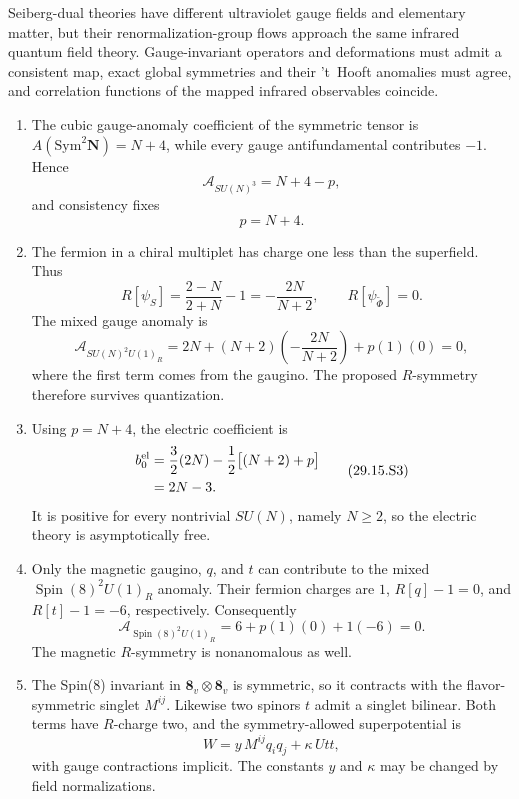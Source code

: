 \begin{enumerate}
  Seiberg-dual theories have different ultraviolet gauge fields and
  elementary matter, but their renormalization-group flows approach the
  same infrared quantum field theory.  Gauge-invariant operators and
  deformations must admit a consistent map, exact global symmetries and
  their 't~Hooft anomalies must agree, and correlation functions of the
  mapped infrared observables coincide.
  \begin{enumerate}
    \item[(i)] The cubic gauge-anomaly coefficient of the symmetric tensor
    is \(A(\mathrm{Sym}^2\boldsymbol N)=N+4\), while every gauge
    antifundamental contributes \(-1\).  Hence
    \[
      \mathcal A_{SU(N)^3}=N+4-p,
    \]
    and consistency fixes
    \[
      \boxed{p=N+4.}
      \tag{29.15.S1}
    \]

    \item[(ii)] The fermion in a chiral multiplet has charge one less than
    the superfield.  Thus
    \[
      R[\psi_S]=\frac{2-N}{2+N}-1=-\frac{2N}{N+2},
      \qquad R[\psi_{\widetilde\Phi}]=0.
    \]
    The mixed gauge anomaly is
    \[
      \mathcal A_{SU(N)^2U(1)_R}
       =2N+(N+2)\left(-\frac{2N}{N+2}\right)+p(1)(0)=0,
      \tag{29.15.S2}
    \]
    where the first term comes from the gaugino.  The proposed
    \(R\)-symmetry therefore survives quantization.

    \item[(iii)] Using \(p=N+4\), the electric coefficient is
    \[
      \begin{split}
      b_0^{\rm el}
       &=\frac32(2N)-\frac12\bigl[(N+2)+p\bigr]\\
       &=2N-3.
      \end{split}
      \tag{29.15.S3}
    \]
    It is positive for every nontrivial \(SU(N)\), namely \(N\geq2\), so
    the electric theory is asymptotically free.

    \item[(iv)] Only the magnetic gaugino, \(q\), and \(t\) can contribute
    to the mixed \(\operatorname{Spin}(8)^2U(1)_R\) anomaly.  Their
    fermion charges are \(1\), \(R[q]-1=0\), and
    \(R[t]-1=-6\), respectively.  Consequently
    \[
      \mathcal A_{\operatorname{Spin}(8)^2U(1)_R}
        =6+p(1)(0)+1(-6)=0.
      \tag{29.15.S4}
    \]
    The magnetic \(R\)-symmetry is nonanomalous as well.

    \item[(v)] The Spin(8) invariant in
    \(\boldsymbol8_v\otimes\boldsymbol8_v\) is symmetric, so it contracts
    with the flavor-symmetric singlet \(M^{ij}\).  Likewise two spinors
    \(t\) admit a singlet bilinear.  Both terms have \(R\)-charge two, and
    the symmetry-allowed superpotential is
    \[
      \boxed{W=y\,M^{ij}q_iq_j+\kappa\,Utt,}
      \tag{29.15.S5}
    \]
    with gauge contractions implicit.  The constants \(y\) and \(\kappa\)
    may be changed by field normalizations.


\end{enumerate}
\end{enumerate}
